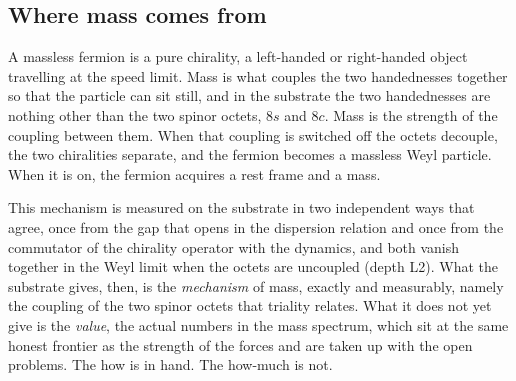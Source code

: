\subsection{Where mass comes from}

A massless fermion is a pure chirality, a left-handed or right-handed object travelling at the speed limit. Mass is what couples the two handednesses together so that the particle can sit still, and in the substrate the two handednesses are nothing other than the two spinor octets, $8s$ and $8c$. Mass is the strength of the coupling between them. When that coupling is switched off the octets decouple, the two chiralities separate, and the fermion becomes a massless Weyl particle. When it is on, the fermion acquires a rest frame and a mass.

This mechanism is measured on the substrate in two independent ways that agree, once from the gap that opens in the dispersion relation and once from the commutator of the chirality operator with the dynamics, and both vanish together in the Weyl limit when the octets are uncoupled (depth L2). What the substrate gives, then, is the \emph{mechanism} of mass, exactly and measurably, namely the coupling of the two spinor octets that triality relates. What it does not yet give is the \emph{value}, the actual numbers in the mass spectrum, which sit at the same honest frontier as the strength of the forces and are taken up with the open problems. The how is in hand. The how-much is not.
